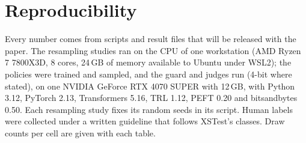 \begin{table}[p]
\centering
\scriptsize

\caption{Predictions registered together, before any of their runs: exact stratified bounds (X), AgentDojo against a
fitted crossed model (W), a second judge family (J), and the update that reordered the
prompts (U). A power ESS is the number of random labels Clopper-Pearson needs to certify as often, over the labels the
bound uses.}
\label{tab:d4}
\end{table}

\section{Reproducibility}

Every number comes from scripts and result files that will be released with the paper. The resampling studies ran on
the CPU of one workstation (AMD Ryzen 7 7800X3D, 8 cores, 24\,GB of memory available to Ubuntu under WSL2); the
policies were trained and sampled, and the guard and judges run (4-bit where stated), on one NVIDIA GeForce RTX 4070
SUPER with 12\,GB, with Python 3.12, PyTorch 2.13, Transformers 5.16, TRL 1.12, PEFT 0.20 and bitsandbytes 0.50. Each
resampling study fixes its random seeds in its script. Human
labels were collected under a written guideline that follows XSTest's classes. Draw counts per cell are given with each
table.
